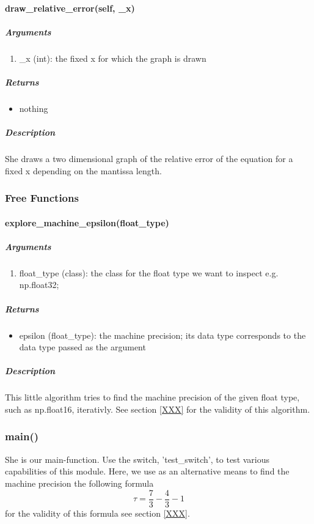 \paragraph{draw\_relative\_error(self, \_x)}
\subparagraph*{Arguments}
\begin{enumerate}
    \item \_x (int): the fixed x for which the graph is drawn
\end{enumerate}
\subparagraph*{Returns}
\begin{itemize}
    \item nothing
\end{itemize}
\subparagraph*{Description}
She draws a two dimensional graph of the relative error of the equation for a fixed x depending on the mantissa length.
\subsubsection{Free Functions}
\paragraph{explore\_machine\_epsilon(float\_type)}
\subparagraph*{Arguments}
\begin{enumerate}
    \item float\_type (class): the class for the float type we want to inspect e.g. np.float32;
\end{enumerate}
\subparagraph*{Returns}
\begin{itemize}
    \item epsilon (float\_type): the machine precision; its data type corresponds to the data type passed as the argument
\end{itemize}
\subparagraph*{Description}
This little algorithm tries to find the machine precision of the given float type, such as np.float16, iterativly. See section \ref{XXX} for the validity of this algorithm.
\subsubsection{main()}
She is our main-function. Use the switch, 'test\_switch', to test various capabilities of this module.
Here, we use as an alternative means to find the machine precision the following formula
\begin{equation*}
    \tau = \frac{7}{3} - \frac{4}{3} - 1
\end{equation*}
for the validity of this formula see section \ref{XXX}.